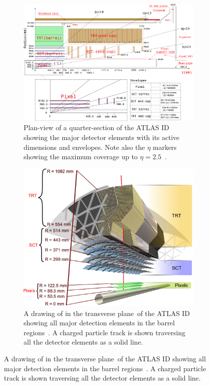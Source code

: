 \begin{figure}[htbp]
  \begin{subfigure}[b]{0.45\textwidth}
    \centering
      \includegraphics[width=\textwidth]{PartDetector/Diagrams/Detector_ID_QuarterView.eps}
      \caption{Plan-view of a quarter-section of the ATLAS ID showing the major detector elements with its active dimensions and envelopes. Note also the $\eta$ markers showing the maximum coverage up to $\eta=2.5$~\cite{Detector:ATLASExperimentGeneral}.}
    \label{fig:DetectorIDQuarter}
  \end{subfigure}
  \hfill
  \begin{subfigure}[b]{0.45\textwidth}
    \centering
      \includegraphics[width=\textwidth]{PartDetector/Diagrams/ID_3D_Overview.eps}
      \caption{A drawing of in the transverse plane of the ATLAS ID showing all major detection elements in the barrel regions~\cite{Detector:ATLASExperimentGeneral}. A charged particle track is shown traversing all the detector elements as a solid line.}
    \label{fig:DetectorIDTransverse}
  \end{subfigure}
\end{figure}



